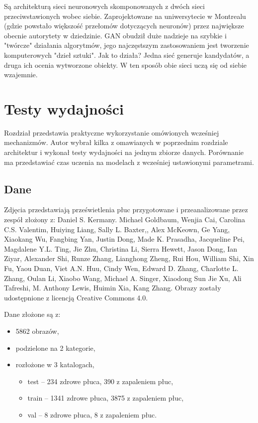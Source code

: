\documentclass[12pt,a4paper,twoside,titlepage,openright]{book}
\begin{document}
 Są architekturą sieci neuronowych skomponowanych z dwóch sieci przeciwstawionych wobec siebie. Zaprojektowane na uniwersytecie w Montrealu (gdzie powstało większość przełomów dotyczących neuronów) przez największe obecnie autorytety w dziedzinie. GAN obudził duże nadzieje na szybkie i "twórcze" działania algorytmów, jego najczęstszym zastosowaniem jest tworzenie komputerowych "dzieł sztuki". Jak to działa? Jedna sieć generuje kandydatów, a druga ich ocenia wytworzone obiekty. W ten sposób obie sieci uczą się od siebie wzajemnie. \cite{NIPS2014_5423}


\chapter{Testy wydajności}
Rozdział przedstawia praktyczne wykorzystanie omówionych wcześniej mechanizmów. Autor wybrał kilka z omawianych w poprzednim rozdziale architektur i wykonał testy wydajności na jednym zbiorze danych. Porównanie ma przedstawiać czas uczenia na modelach z wcześniej ustawionymi parametrami.

\section{Dane}
Zdjęcia przedstawiają prześwietlenia płuc przygotowane i przeanalizowane przez zespół złożony z: Daniel S. Kermany. Michael Goldbaum, Wenjia Cai, Carolina C.S. Valentim, Huiying Liang, Sally L. Baxter,, Alex McKeown, Ge Yang, Xiaokang Wu, Fangbing Yan, Justin Dong, Made K. Prasadha, Jacqueline Pei, Magdalene Y.L. Ting, Jie Zhu, Christina Li, Sierra Hewett, Jason Dong, Ian Ziyar, Alexander Shi, Runze Zhang, Lianghong Zheng, Rui Hou, William Shi, Xin Fu, Yaou Duan, Viet A.N. Huu, Cindy Wen, Edward D. Zhang, Charlotte L. Zhang, Oulan Li, Xiaobo Wang, Michael A. Singer, Xiaodong Sun Jie Xu, Ali Tafreshi, M. Anthony Lewis, Huimin Xia, Kang Zhang. Obrazy zostały udostępnione z licencją Creative Commons 4.0. \cite{siteCell}

Dane złożone są z:
\begin{itemize}
\item 5862 obrazów,
\item podzielone na 2 kategorie,
\item rozłożone w 3 katalogach,
\begin{itemize}
\item test -- 234 zdrowe płuca, 390 z zapaleniem płuc,
\item train -- 1341 zdrowe płuca, 3875 z zapaleniem płuc,
\item val -- 8 zdrowe płuca, 8 z zapaleniem płuc.
\end{itemize}
\end{itemize}
\end{document}
